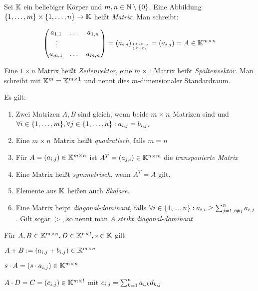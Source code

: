 \begin{definition}[Matrix]
	Sei $\mathbb{K}$ ein beliebiger Körper und $m,n \in \mathbb{N} \setminus \{0\}$. Eine Abbildung $\{ 1, \dots, m \} \times \{ 1, \dots, n \} \rightarrow \mathbb{K}$ heißt \emph{Matrix}. Man schreibt:

	\begin{align*}
		\begin{pmatrix}
			a_{1,1} & \dots & a_{1,n} \\
			\vdots  &       &         \\
			a_{m,1} & \dots & a_{m,n}
		\end{pmatrix}
		= (a_{i,j})_{1 \leq i \leq m \atop 1 \leq j \leq n}
		= (a_{i,j}) = A \in \mathbb{K}^{m \times n}
	\end{align*}	

	Eine $1 \times n$ Matrix heißt \emph{Zeilenvektor}, eine $m \times 1$ Matrix heißt \emph{Spaltenvektor}. Man schreibt mit $\mathbb{K}^m = \mathbb{K}^{m \times 1}$ und nennt dies $m$-dimensionaler Standardraum. 
\end{definition}

\begin{definition}
	Es gilt:
	\begin{enumerate}[noitemsep]
		\item Zwei Matrizen $A,B$ sind gleich, wenn beide $m \times n$ Matrizen sind und $\forall i \in \{ 1, \dots, m \}, \forall j \in \{ 1, \dots, n \} : a_{i,j} = b_{i,j}$.
		\item Eine $m \times n$ Matrix heißt \emph{quadratisch}, falls $m=n$
		\item Für $A = (a_{i,j}) \in \mathbb{K}^{m \times n}$ ist $A^T = (a_{j,i}) \in \mathbb{K}^{n \times m} $ die \emph{transponierte Matrix}
		\item Eine Matrix heißt \emph{symmetrisch}, wenn $A^T = A$ gilt.
		\item Elemente aus $\mathbb{K}$ heißen auch \emph{Skalare}. 
		\item Eine Matrix heipt \emph{diagonal-dominant}, falls $\forall i \in \{1,...,n\} : a_{i,i} \geq \sum_{j=1, i \neq j}^{n} a_{i,j} $. Gilt sogar $>$, so nennt man $A$ \emph{strikt diagonal-dominant}
	\end{enumerate}

\end{definition}

\begin{definition}
	Für $A, B \in \mathbb{K}^{m \times n}, D \in \mathbb{K}^{n \times l}, s \in \mathbb{K}$ gilt:
	\begin{description}[noitemsep]
		\item $A + B := (a_{i,j} + b_{i,j}) \in \mathbb{K}^{m \times n}$
		\item $s \cdot A = (s \cdot a_{i,j}) \in \mathbb{K}^{m \times n}$
		\item $A \cdot D = C = (c_{i,j}) \in \mathbb{K}^{m \times l}$ mit $c_{i,j} = \sum_{k=1}^{n}a_{i,k} d_{k,j}$
	\end{description}
\end{definition}

